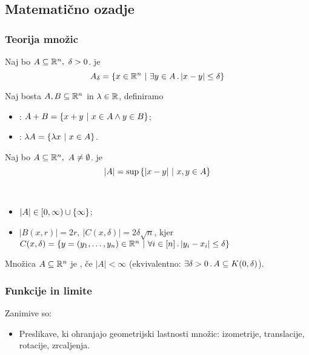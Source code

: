 \newpage
\subsection{Matematično ozadje}
\subsubsection*{Teorija množic}
\begin{definicija}
    Naj bo \(A \subseteq \mathbb{R}^n, \ \delta > 0\).  je 
    \[A_\delta = \left\{x \in \mathbb{R}^n \ | \ \exists y \in A \,.\, |x-y| \leq \delta\right\}\]
\end{definicija}

\begin{definicija}
    Naj bosta \(A, B \subseteq \mathbb{R}^n\) in \(\lambda \in \mathbb{R}\), definiramo 
    \begin{itemize}
        \item {}: \(A + B = \left\{x +y \ | \ x \in A \land y \in B\right\}\);
        \item {}: \(\lambda A = \left\{\lambda x \ | \ x \in A\right\}\).
    \end{itemize}
\end{definicija}

\begin{definicija}
    Naj bo \(A \subseteq \mathbb{R}^n, \ A \neq \emptyset\).  je 
    \[|A| = \sup \left\{|x - y| \ | \ x, y \in A\right\}\]
\end{definicija}

\begin{opomba} \
    \begin{itemize}
        \item \(|A| \in [0, \infty) \cup \left\{\infty\right\}\);
        \item \(|B(x,r)| = 2r, \ |C(x, \delta)| = 2\delta \sqrt{n}\), kjer \(C(x, \delta) = \left\{y = (y_1, \ldots, y_n) \in \mathbb{R}^n \ | \ \forall i \in [n] \,.\, |y_i - x_i| \leq \delta\right\}\)
    \end{itemize}
\end{opomba}

\begin{definicija}
    Množica \(A \subseteq \mathbb{R}^n\) je , če \(|A| < \infty\) (ekvivalentno: \(\exists \delta > 0 \,.\, A \subseteq K(0, \delta)\)). 
\end{definicija}

\subsubsection*{Funkcije in limite}
Zanimive so:
\begin{itemize}
    \item Preslikave, ki ohranjajo geometrijski lastnosti množic: izometrije, translacije, rotacije, zrcaljenja.
\end{itemize}

